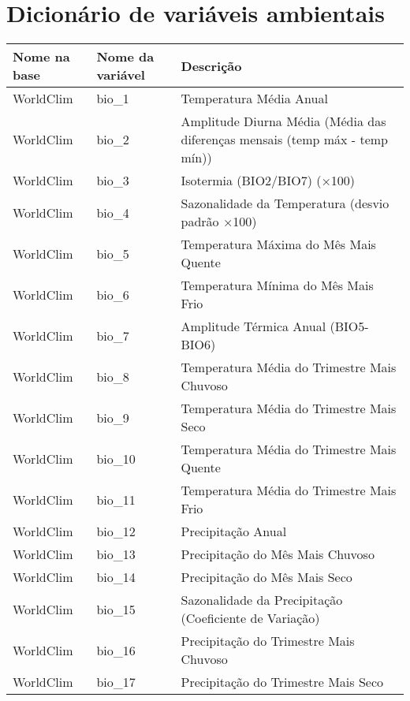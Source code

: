 
\section{Dicionário de variáveis ambientais}\label{sec: dicionario-ambientais}

\begin{longtable}{@{} p{4cm} p{4cm} p{8cm} @{}} 
	\toprule
	\textbf{Nome na base} &
	\textbf{Nome da variável} &
	\textbf{Descrição} \\* \midrule
	\endfirsthead
	\endhead
	\bottomrule
	\endfoot
	\endlastfoot
	WorldClim &
	bio\_1 &
	Temperatura Média Anual \\
	WorldClim &
	bio\_2 &
	Amplitude Diurna Média (Média das diferenças mensais (temp máx - temp mín)) \\
	WorldClim &
	bio\_3 &
	Isotermia (BIO2/BIO7) (×100) \\
	WorldClim &
	bio\_4 &
	Sazonalidade da Temperatura (desvio padrão ×100) \\
	WorldClim &
	bio\_5 &
	Temperatura Máxima do Mês Mais Quente \\
	WorldClim &
	bio\_6 &
	Temperatura Mínima do Mês Mais Frio \\
	WorldClim &
	bio\_7 &
	Amplitude Térmica Anual (BIO5-BIO6) \\
	WorldClim &
	bio\_8 &
	Temperatura Média do Trimestre Mais Chuvoso \\
	WorldClim &
	bio\_9 &
	Temperatura Média do Trimestre Mais Seco \\
	WorldClim &
	bio\_10 &
	Temperatura Média do Trimestre Mais Quente \\
	WorldClim &
	bio\_11 &
	Temperatura Média do Trimestre Mais Frio \\
	WorldClim &
	bio\_12 &
	Precipitação Anual \\
	WorldClim &
	bio\_13 &
	Precipitação do Mês Mais Chuvoso \\
	WorldClim &
	bio\_14 &
	Precipitação do Mês Mais Seco \\
	WorldClim &
	bio\_15 &
	Sazonalidade da Precipitação (Coeficiente de Variação) \\
	WorldClim &
	bio\_16 &
	Precipitação do Trimestre Mais Chuvoso \\
	WorldClim &
	bio\_17 &
	Precipitação do Trimestre Mais Seco \\

\end{longtable}
